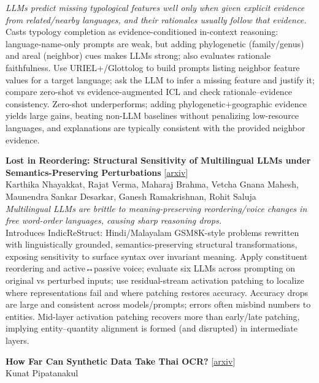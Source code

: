 \documentclass[12pt,letterpaper]{article}
\begin{document}
{\small\textit{LLMs predict missing typological features well only when given explicit evidence from related/nearby languages, and their rationales usually follow that evidence.}}\\[1pt]
{\footnotesize Casts typology completion as evidence-conditioned in-context reasoning: language-name-only prompts are weak, but adding phylogenetic (family/genus) and areal (neighbor) cues makes LLMs strong; also evaluates rationale faithfulness. Use URIEL+/Glottolog to build prompts listing neighbor feature values for a target language; ask the LLM to infer a missing feature and justify it; compare zero-shot vs evidence-augmented ICL and check rationale--evidence consistency. Zero-shot underperforms; adding phylogenetic+geographic evidence yields large gains, beating non-LLM baselines without penalizing low-resource languages, and explanations are typically consistent with the provided neighbor evidence.}

\medskip

{\small\textbf{Lost in Reordering: Structural Sensitivity of Multilingual LLMs under Semantics-Preserving Perturbations}} {\scriptsize[\href{https://arxiv.org/abs/2609.03511}{arxiv}]}\\
{\scriptsize Karthika Nhayakkat, Rajat Verma, Maharaj Brahma, Vetcha Gnana Mahesh, Maunendra Sankar Desarkar, Ganesh Ramakrishnan, Rohit Saluja}\\

{\small\textit{Multilingual LLMs are brittle to meaning-preserving reordering/voice changes in free word-order languages, causing sharp reasoning drops.}}\\[1pt]
{\footnotesize Introduces IndicReStruct: Hindi/Malayalam GSM8K-style problems rewritten with linguistically grounded, semantics-preserving structural transformations, exposing sensitivity to surface syntax over invariant meaning. Apply constituent reordering and active↔passive voice; evaluate six LLMs across prompting on original vs perturbed inputs; use residual-stream activation patching to localize where representations fail and where patching restores accuracy. Accuracy drops are large and consistent across models/prompts; errors often misbind numbers to entities. Mid-layer activation patching recovers more than early/late patching, implying entity--quantity alignment is formed (and disrupted) in intermediate layers.}

\medskip

{\small\textbf{How Far Can Synthetic Data Take Thai OCR?}} {\scriptsize[\href{https://arxiv.org/abs/2609.03595}{arxiv}]}\\
{\scriptsize Kunat Pipatanakul}\\
\end{document}
